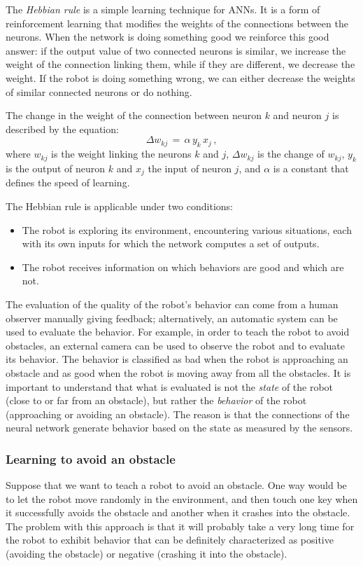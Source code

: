 The \emph{Hebbian rule} is a simple learning technique for ANNs. It is a form of reinforcement learning that modifies the weights of the connections between the neurons. When the network is doing something good we reinforce this good answer: if the output value of two connected neurons is similar, we increase the weight of the connection linking them, while if they are different, we decrease the weight. If the robot is doing something wrong, we can either decrease the weights of similar connected neurons or do nothing.

The change in the weight of the connection between neuron $k$ and neuron $j$ is described by the equation:
\[
\Delta w_{kj}\,=\,\alpha \, y_{k} \, x_{j}\,,\label{eq.hebbian}
\]
where $w_{kj}$ is the weight linking the neurons $k$ and $j$, $\Delta w_{kj}$ is the change of $w_{kj}$, $y_{k}$ is the output of neuron $k$ and $x_{j}$ the input of neuron $j$, and $\alpha$ is a constant that defines the speed of learning. 

The Hebbian rule is applicable under two conditions:
\begin{itemize}
\item The robot is exploring its environment, encountering various situations, each with its own inputs for which the network computes a set of outputs.
\item The robot receives information on which behaviors are good and which are not.
\end{itemize}
The evaluation of the quality of the robot's behavior can come from a human observer manually giving feedback; alternatively, an automatic system can be used to evaluate the behavior. For example, in order to teach the robot to avoid obstacles, an external camera can be used to observe the robot and to evaluate its behavior. The behavior is classified as bad when the robot is approaching an obstacle and as good when the robot is moving away from all the obstacles. It is important to understand that what is evaluated is not the \emph{state} of the robot (close to or far from an obstacle), but rather the \emph{behavior} of the robot (approaching or avoiding an obstacle). The reason is that the connections of the neural network generate behavior based on the state as measured by the sensors.

\subsubsection*{Learning to avoid an obstacle}

Suppose that we want to teach a robot to avoid an obstacle. One way would be to let the robot move randomly in the environment, and then touch one key when it successfully avoids the obstacle and another when it crashes into the obstacle. The problem with this approach is that it will probably take a very long time for the robot to exhibit behavior that can be definitely characterized as positive (avoiding the obstacle) or negative (crashing it into the obstacle).


